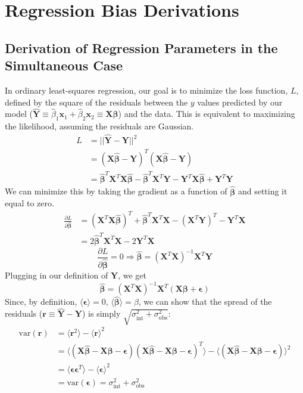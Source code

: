 \chapter{Regression Bias Derivations}
\section{Derivation of Regression Parameters in the Simultaneous Case}
\label{app:simultaneous_ols}
In ordinary least-squares regression, our goal is to minimize the loss function, $L$, defined by the square of the residuals between the $y$ values predicted by our model ($\hat{\bm{Y}}\equiv\hat{\beta}_1\bm{x}_1 +\hat{\beta}_2\bm{x}_2\equiv\bm{X\hat{\beta}}$) and the data. This is equivalent to maximizing the likelihood, assuming the residuals are Gaussian.
\begin{align*}
    L &= ||\hat{\bm{Y}}-\bm{Y}||^2\\
    &= (\bm{X\hat{\beta}}-\bm{Y})^T(\bm{X\hat{\beta}}-\bm{Y})\\
    &= \bm{\hat{\beta}}^T\bm{X}^T\bm{X\hat{\beta}}
    - \bm{\hat{\beta}}^T\bm{X}^T\bm{Y}
    - \bm{Y}^T\bm{X\hat{\beta}}
    + \bm{Y}^T\bm{Y}
\end{align*}
We can minimize this by taking the gradient as a function of $\bm{\hat{\beta}}$ and setting it equal to zero.
\begin{align*}
    \frac{\partial L}{\partial\bm{\hat{\beta}}} &=
    (\bm{X}^T\bm{X}\bm{\hat{\beta}})^T
    + \bm{\hat{\beta}}^T\bm{X}^T\bm{X}
    - (\bm{X}^T\bm{Y})^T
    - \bm{Y}^T\bm{X}\\
    &= 2\bm{\hat{\beta}}^T\bm{X}^T\bm{X} - 2\bm{Y}^T\bm{X}
\end{align*}
$$\frac{\partial L}{\partial\bm{\hat{\beta}}} = 0 \Rightarrow \bm{\hat{\beta}}=(\bm{X}^T\bm{X})^{-1}\bm{X}^T\bm{Y}$$
Plugging in our definition of $\bm{Y}$, we get
\begin{equation}
    \bm{\hat{\beta}} = (\bm{X}^T\bm{X})^{-1}\bm{X}^T(\bm{X\beta} + \bm{\epsilon})
\label{eqn:sim_beta_vec_app}
\end{equation}
Since, by definition, $\langle\bm{\epsilon}\rangle=0$, $\langle\bm{\hat{\beta}}\rangle = \beta$, we can show that the spread of the residuals ($\bm{r}\equiv\bm{\hat{Y}}-\bm{Y}$) is simply $\sqrt{\sigma_\text{int}^2 + \sigma_\text{obs}^2}$:
\begin{align*}
    \text{var}(\bm{r}) &= \langle\bm{r}^2\rangle - \langle\bm{r}\rangle^2\\
    &= \langle(\bm{X\hat{\beta}}-\bm{X\beta}-\bm{\epsilon})(\bm{X\hat{\beta}}-\bm{X\beta}-\bm{\epsilon})^T\rangle - \langle(\bm{X\hat{\beta}}-\bm{X\beta}-\bm{\epsilon})\rangle^2\\
    &= \langle\bm{\epsilon}\bm{\epsilon}^T\rangle - \langle\bm{\epsilon}\rangle^2\\
    &= \text{var}(\bm{\epsilon}) = \sigma_\text{int}^2 + \sigma_\text{obs}^2
\end{align*}

